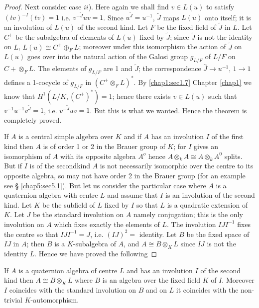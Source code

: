 \begin{proof}
Next consider case $ii$). Here again we shall find $v \in L (u)$ to
satisfy $(tv)^{-I}(tv) = 1$  i.e. $v^{-\widetilde{J}}uv=1$.  Since
$u^{\widetilde{J}}= u^{-1}$, $\widetilde{J}$ maps $L(u)$ onto itself;
it is an involution of $L(u)$ of the second kind. Let $F$ be the fixed
field of $\widetilde{J}$ in $L$. Let $C^+$ be the subalgebra of
elements of $L(u)$ fixed by $\widetilde{J}$;  since $\widetilde{J}$ is
not the identity on $L$, $L(u) \cong C^+ \oplus_F L$; moreover under
this isomorphism the action of $\widetilde{J}$ on $L(u)$ goes over into the
natural action of the Galosi group $g_{L/F}$ of $L/F$ on $C+ \otimes_F
L$. The elements of $g_{L/F}$ are 1 and $\tilde{J}$; the
correspondence
$\overset{\sim}J \to u^{-1}$, $1 \to 1$ defines a 1-cocycle of $g_{L/F}$
in $(C^+ \otimes_F L)^*$. By \ref{chap1:sec1.7} Chapter \ref{chap1}
we know that $H^1
(L/K,(C^+)^*) =1$; hence there exists $v \in L(u)$ such that
$v^{-1}u^{-1}v^{\widetilde{J}}=1$, i.e. $v^{-\widetilde{J}} uv
=1$. But this is what we wanted. Hence the theorem is completely
proved. 

If $A$ is a central simple algebra over $K$ and if $A$ has an
involution $I$ of the first kind then $A$ is of order 1 or 2 in
the Brauer group of $K$; for $I$ gives an isomorphism of $A$ with its
opposite algebra $A^o$ hence $A \otimes_k A \cong A \otimes_k
A^0$ splits. But if $I$ is of the second\pageoriginale kind $A$ is not
necessarily isomorphic over the centre to its opposite algebra, so
may not have order 2 in the Brauer group (for an example see \S
\ref{chap5:sec5.1}). But let us consider the particular case where $A$ is a
quaternion algebra with centre $L$ and assume that $I$ is an
involution of the second kind. Let $K$ be the subfield of $L$ fixed by
$I$ so that $L$ is a quadratic extension of $K$. Let $J$ be the
standard involution on $A$ namely conjugation; this is the only
involution on $A$ which fixes exactly the elements of $L$. The
involution $IJI^{-1}$ fixes the centre so that $IJI^{-1}= J$, 
i.e. $(IJ)^2=$ identity. Let $B$ be the fixed space of $IJ$ in $A$; then
$B$ is a $K$-subalgebra of $A$, and $A \cong B \otimes_K L$
since $IJ$ is not the identity $L$. Hence we have proved the following  
\end{proof}

\setcounter{proposition}{0}
\begin{proposition}\label{chap2:prop1}%
 If $A$ is a quaternion algebra of centre $L$ and has an involution
 $I$ of the second kind then $A \cong B \otimes_K L$ where $B$ is an algebra
 over the fixed field $K$ of $I$. Moreover $I$ coincides with the
 standard involution on $B$ and on $L$ it coincides with the
 non-trivial $K$-automorphism. 
 \end{proposition}
 


